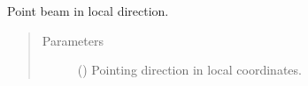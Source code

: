\documentclass[letterpaper,10pt,english]{sphinxmanual}
\begin{document}
\begin{fulllineitems}

\begin{fulllineitems}
\label{\detokenize{modules/antenna:antenna.BeamPattern.point_k0}}
Point beam in local direction.
\begin{quote}\begin{description}
\item[{Parameters}] \leavevmode
{} () \textendash{} Pointing direction in local coordinates.

\end{description}\end{quote}

\end{fulllineitems}


\end{fulllineitems}

\end{document}
